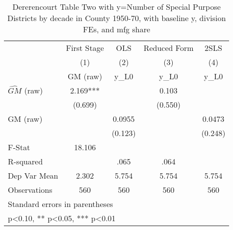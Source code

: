 \begin{table}[htbp]\centering
\def\sym#1{\ifmmode^{#1}\else\(^{#1}\)\fi}
\caption{Dererencourt Table Two with y=Number of Special Purpose Districts by decade in County 1950-70, with baseline y, division FEs, and mfg share}
\begin{tabular}{l*{4}{c}}
\toprule
                    & First Stage   &         OLS   &Reduced Form   &        2SLS   \\
                    &\multicolumn{1}{c}{(1)}&\multicolumn{1}{c}{(2)}&\multicolumn{1}{c}{(3)}&\multicolumn{1}{c}{(4)}\\
                    &\multicolumn{1}{c}{GM  (raw)}&\multicolumn{1}{c}{y\_L0}&\multicolumn{1}{c}{y\_L0}&\multicolumn{1}{c}{y\_L0}\\
\midrule
$\hat{GM}$ (raw)    &       2.169***&               &       0.103   &               \\
                    &     (0.699)   &               &     (0.550)   &               \\
\addlinespace
GM  (raw)           &               &      0.0955   &               &      0.0473   \\
                    &               &     (0.123)   &               &     (0.248)   \\
\midrule
F-Stat              &      18.106   &               &               &               \\
R-squared           &               &        .065   &        .064   &               \\
Dep Var Mean        &       2.302   &       5.754   &       5.754   &       5.754   \\
Observations        &         560   &         560   &         560   &         560   \\
\bottomrule
\multicolumn{5}{l}{\footnotesize Standard errors in parentheses}\\
\multicolumn{5}{l}{\footnotesize * p<0.10, ** p<0.05, *** p<0.01}\\
\end{tabular}
\end{table}
